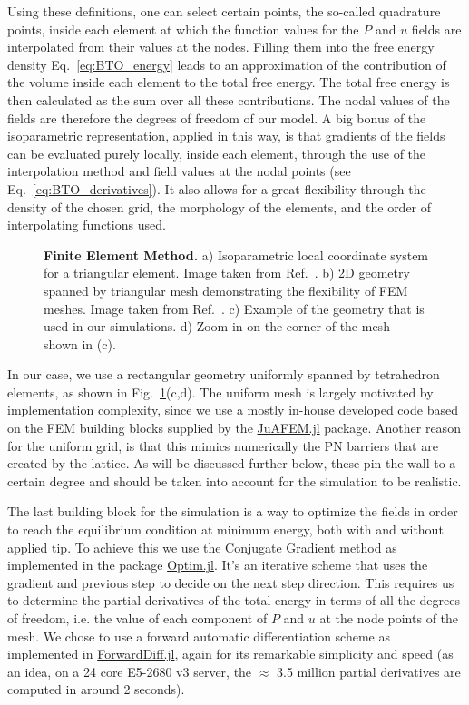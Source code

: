 Using these definitions, one can select certain points, the so-called quadrature points, inside each element at which the function values for the $P$ and $u$ fields are interpolated from their values at the nodes.
Filling them into the free energy density Eq.~\ref{eq:BTO_energy} leads to an approximation of the contribution of the volume inside each element to the total free energy.
The total free energy is then calculated as the sum over all these contributions. 
The nodal values of the fields are therefore the degrees of freedom of our model. 
A big bonus of the isoparametric representation, applied in this way, is that gradients of the fields can be evaluated purely locally, inside each element, through the use of the interpolation method and field values at the nodal points (see Eq.~\ref{eq:BTO_derivatives}).
It also allows for a great flexibility through the density of the chosen grid, the morphology of the elements, and the order of interpolating functions used.

\begin{figure}[h!]
	\caption{\label{fig:BTO_fem}{\bf Finite Element Method.} a) Isoparametric local coordinate system for a triangular element. Image taken from Ref.~\cite{Biner}. b) 2D geometry spanned by triangular mesh demonstrating the flexibility of FEM meshes. Image taken from Ref.~\cite{2Dmesh}. c) Example of the geometry that is used in our simulations. d) Zoom in on the corner of the mesh shown in (c).}
\end{figure}

In our case, we use a rectangular geometry uniformly spanned by tetrahedron elements, as shown in Fig.~\ref{fig:BTO_fem}(c,d).
The uniform mesh is largely motivated by implementation complexity, since we use a mostly in-house developed code based on the FEM building blocks supplied by the \href{https://github.com/KristofferC/JuAFEM.jl}{JuAFEM.jl} package.
Another reason for the uniform grid, is that this mimics numerically the PN barriers that are created by the lattice.
As will be discussed further below, these pin the wall to a certain degree and should be taken into account for the simulation to be realistic.

The last building block for the simulation is a way to optimize the fields in order to reach the equilibrium condition at minimum energy, both with and without applied tip.
To achieve this we use the Conjugate Gradient method \cite{Hestenes1952,Hager2005} as implemented in the package \href{https://github.com/JuliaNLSolvers/Optim.jl}{Optim.jl}.
It's an iterative scheme that uses the gradient and previous step to decide on the next step direction. 
This requires us to determine the partial derivatives of the total energy in terms of all the degrees of freedom, i.e. the value of each component of $P$ and $u$ at the node points of the mesh.
We chose to use a forward automatic differentiation scheme as implemented in \href{www.juliadiff.org/ForwardDiff.jl/latest/}{ForwardDiff.jl}, again for its remarkable simplicity and speed (as an idea, on a 24 core E5-2680 v3 server, the $\approx$ 3.5 million partial derivatives are computed in around 2 seconds).


